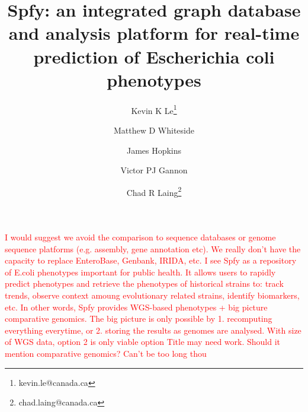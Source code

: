 \documentclass{article}
\newcommand\mwcomment[1]{\textcolor{red}{#1}}
\begin{document}
\mwcomment{I would suggest we avoid the comparison to sequence databases or genome sequence platforms (e.g. assembly, gene annotation etc). We really don't have the capacity to replace EnteroBase, Genbank, IRIDA, etc. I see Spfy as a repository of E.coli phenotypes important for public health. It allows users to rapidly predict phenotypes and retrieve the phenotypes of historical strains to: track trends, observe context amoung evolutionary related strains, identify biomarkers, etc. In other words, Spfy provides WGS-based phenotypes + big picture comparative genomics. The big picture is only possible by 1. recomputing everything everytime, or 2. storing the results as genomes are analysed. With size of WGS data, option 2 is only viable option}
\mwcomment{Title may need work. Should it mention comparative genomics? Can't be too long thou}
\title{Spfy: an integrated graph database and analysis platform for real-time prediction of Escherichia coli phenotypes}

\author[1]{Kevin K Le\thanks{kevin.le@canada.ca}}
\author[1]{Matthew D Whiteside}
\author[1]{James Hopkins}
\author[1]{Victor PJ Gannon}
\author[1]{Chad R Laing\thanks{chad.laing@canada.ca}}

\renewcommand\Authands{ and }

\maketitle
\end{document}
